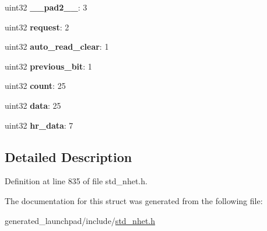 \begin{DoxyCompactItemize}
\item 
\mbox{\label{structpcnt__format_ab1dfcd1a2df46a25f41e06be704bc878}} 
uint32 {\bfseries \+\_\+\+\_\+pad2\+\_\+\+\_\+}\+: 3
\item 
\mbox{\label{structpcnt__format_a91dc8723271d603d7dc38d92f101817d}} 
uint32 {\bfseries request}\+: 2
\item 
\mbox{\label{structpcnt__format_a4356f3672e46d4fb3918e2afca6af22e}} 
uint32 {\bfseries auto\+\_\+read\+\_\+clear}\+: 1
\item 
\mbox{\label{structpcnt__format_ac785f08374ee8ebc884f51d3d7f5408c}} 
uint32 {\bfseries previous\+\_\+bit}\+: 1
\item 
\mbox{\label{structpcnt__format_a0a286912daba6bc9ef9498b6281951aa}} 
uint32 {\bfseries count}\+: 25
\item 
\mbox{\label{structpcnt__format_adbe212caa03f71fdcb35e813ba710176}} 
uint32 {\bfseries data}\+: 25
\item 
\mbox{\label{structpcnt__format_a91e57c3bbf565deea13d0208ece819dd}} 
uint32 {\bfseries hr\+\_\+data}\+: 7
\end{DoxyCompactItemize}


\subsection{Detailed Description}


Definition at line 835 of file std\+\_\+nhet.\+h.



The documentation for this struct was generated from the following file\+:\begin{DoxyCompactItemize}
\item 
generated\+\_\+launchpad/include/\mbox{\hyperlink{std__nhet_8h}{std\+\_\+nhet.\+h}}\end{DoxyCompactItemize}
